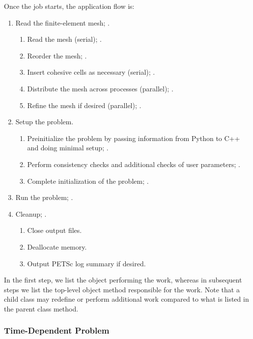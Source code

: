 Once the job starts, the application flow is:
\begin{enumerate}
\item Read the finite-element mesh; .
  \begin{enumerate}
  \item Read the mesh (serial); .
  \item Reorder the mesh; .
  \item Insert cohesive cells as necessary (serial); .
  \item Distribute the mesh across processes (parallel); .
  \item Refine the mesh if desired (parallel); .
  \end{enumerate}
\item Setup the problem.
  \begin{enumerate}
  \item Preinitialize the problem by passing information from Python
    to C++ and doing minimal setup; .
  \item Perform consistency checks and additional checks of user
    parameters; .
  \item Complete initialization of the problem;
    .
  \end{enumerate}
\item Run the problem; .
\item Cleanup; .
  \begin{enumerate}
  \item Close output files.
  \item Deallocate memory.
  \item Output PETSc log summary if desired.
  \end{enumerate}
\end{enumerate}

In the first step, we list the object performing the work, whereas in
subsequent steps we list the top-level object method responsible for
the work. Note that a child class may redefine or perform additional
work compared to what is listed in the parent class method.

\subsubsection{Time-Dependent Problem}

